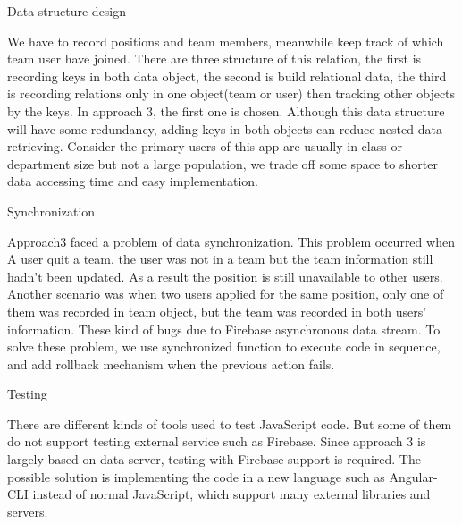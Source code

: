 \documentclass[conference]{IEEEtran}
\begin{document}
Data structure design

We have to record positions and team members, meanwhile keep track of which team user have joined. There are three structure of this relation, the first is recording keys in both data object, the second is build relational data, the third is recording relations only in one object(team or user) then tracking other objects by the keys. In approach 3, the first one is chosen. Although this data structure will have some redundancy, adding keys in both objects can reduce nested data retrieving. Consider the primary users of this app are usually in class or department size but not a large population, we trade off some space to shorter data accessing time and easy implementation.

Synchronization

Approach3 faced a problem of data synchronization. This problem occurred when A user quit a team, the user was not in a team but the team information still hadn't been updated. As a result the position is still unavailable to other users. Another scenario was when two users applied for the same position, only one of them was recorded in team object, but the team was recorded in both users' information. These kind of bugs due to Firebase asynchronous data stream. To solve these problem, we use synchronized function to execute code in sequence, and add rollback mechanism when the previous action fails.

Testing

There are different kinds of tools used to test JavaScript code. But some of them do not support testing external service such as Firebase. Since approach 3 is largely based on data server, testing with Firebase support is required. The possible solution is implementing the code in a new language such as Angular-CLI instead of normal JavaScript, which support many external libraries and servers.
\end{document}
